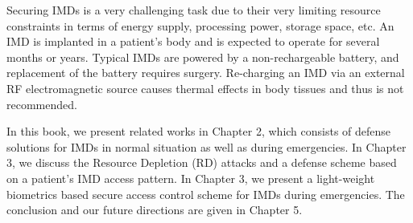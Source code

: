 Securing IMDs is a very challenging task due
to their very limiting resource constraints in terms of energy
supply, processing power, storage space, etc. An IMD is implanted in a patient's body and is expected to operate
for several months or years. Typical IMDs are powered by a non-rechargeable battery, and replacement of the battery requires surgery. Re-charging an IMD via an external RF electromagnetic source causes thermal effects in body tissues and thus is not recommended. 


In this book, we present related works in Chapter 2, which consists
of defense solutions for IMDs in normal situation as well as during emergencies. In Chapter 3, we discuss the Resource Depletion (RD) attacks and a defense scheme based on a patient's IMD access pattern. In Chapter 3, we present a light-weight biometrics based secure access control scheme for IMDs during emergencies. The conclusion and our future directions are given in Chapter 5.

%
